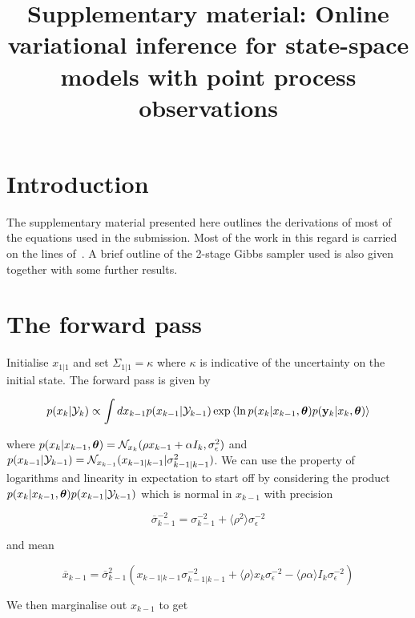\documentclass{article}
\title{Supplementary material: Online variational inference for state-space models
with point process observations}
\begin{document}
\maketitle

\section{Introduction}

The supplementary material presented here outlines the derivations of most of the equations used in the submission.  Most of the work in this regard is carried on the lines of~\cite{Beal_2003b}. A brief outline of the 2-stage Gibbs sampler used is also given together with some further results.

\section{The forward pass} \label{sec:FP}

Initialise $x_{1|1}$ and set $\Sigma_{1|1} = \kappa$ where $\kappa$ is indicative of the uncertainty on the initial state. The forward pass is given by~\cite{Beal_2003b}

\begin{equation*}
p(x_k | \mathcal{Y}_k) \propto \int {dx_{k-1}} p(x_{k-1} | \mathcal{Y}_{k-1})\exp{\langle \ln p(x_k | x_{k-1},{\bm \theta}) p({\bf y}_k| x_k,{\bm \theta})\rangle}
\end{equation*}

\noindent where $p(x_k | x_{k-1},{\bm \theta}) = \mathcal{N}_{x_k}(\rho x_{k-1} + \alpha I_k, \sigma^2_{\epsilon})$ and $p(x_{k-1} | \mathcal{Y}_{k-1}) = \mathcal{N}_{x_{k-1}}(x_{k-1|k-1} | \sigma^{2}_{k-1|k-1})$. We can use the property of logarithms and linearity in expectation to start off by considering the product $p(x_k | x_{k-1},{\bm \theta})p(x_{k-1} | \mathcal{Y}_{k-1})$ which is normal in $x_{k-1}$ with precision

\begin{equation*}
\overline{\sigma}^{-2}_{k-1} = \sigma^{-2}_{k-1} + \langle \rho^2 \rangle\sigma^{-2}_\epsilon
\end{equation*}

\noindent and mean

\begin{equation*}
\overline{x}_{k-1} = \overline{\sigma}^{2}_{k-1}(x_{k-1 | k-1}\sigma^{-2}_{k-1|k-1} + \langle \rho \rangle x_k  \sigma^{-2}_\epsilon - \langle \rho\alpha \rangle I_k  \sigma^{-2}_\epsilon)
\end{equation*}

We then marginalise out $x_{k-1}$ to get
\end{document}
